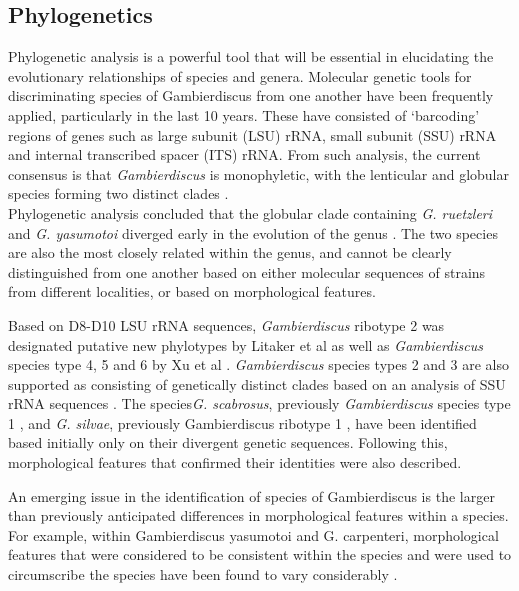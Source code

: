 \documentclass[12pt]{article}
\begin{document}
\subsection{Phylogenetics}

Phylogenetic analysis is a powerful tool that will be essential in elucidating the evolutionary relationships of species and genera. Molecular genetic tools for discriminating species of Gambierdiscus from one another have been frequently applied, particularly in the last 10 years. These have consisted of ‘barcoding’ regions of genes such as large subunit (LSU) rRNA, small subunit (SSU) rRNA and internal transcribed spacer (ITS) rRNA. From such analysis, the current consensus is that \emph{Gambierdiscus} is monophyletic, with the lenticular and globular species forming two distinct clades \cite{chinain1999morphology,litaker2009taxonomy,fraga2011gambierdiscus,richlen2008phylogeography,kuno2010genetic,litaker2010global,nishimura2013genetic}. \\
Phylogenetic analysis concluded that the globular clade containing \emph{G. ruetzleri} and \emph{G. yasumotoi} diverged early in the evolution of the genus \cite{litaker2009taxonomy,nishimura2013genetic}. The two species are also the most closely related within the genus, and cannot be clearly distinguished from one another based on either molecular sequences of strains from different localities, or based on morphological features. 

Based on D8-D10 LSU rRNA sequences, \emph{Gambierdiscus} ribotype 2 was designated putative new phylotypes by Litaker et al \cite{litaker2010global} as well as \emph{Gambierdiscus} species type 4, 5 and 6 by Xu et al \cite{xu2014distribution}. \emph{Gambierdiscus} species types 2 and 3 are also supported as consisting of genetically distinct clades based on an analysis of SSU rRNA sequences \cite{nishimura2013genetic,kuno2010genetic}. The species\emph{G. scabrosus}, previously \emph{Gambierdiscus} species type 1 \cite{nishimura2013genetic,nishimura2014morphology},  and \emph{G. silvae}, previously Gambierdiscus ribotype 1 \cite{fraga2014genus}, have been identified based initially only on their divergent genetic sequences. Following this, morphological features that confirmed their identities were also described. 

An emerging issue in the identification of species of Gambierdiscus is the larger than previously anticipated differences in morphological features within a species. For example, within Gambierdiscus yasumotoi and G. carpenteri, morphological features that were considered to be consistent within the species and were used to circumscribe the species have been found to vary considerably \cite{murray2014molecular,kohli2014high}.
\end{document}
